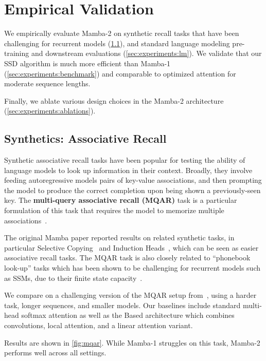 \section{Empirical Validation}
\label{sec:experiments}

We empirically evaluate Mamba-2 on synthetic recall tasks that have been challenging for recurrent models (\ref{sec:experiments:mqar}), and standard language modeling pre-training and downstream evaluations (\ref{sec:experiments:lm}).
We validate that our SSD algorithm is much more efficient than Mamba-1 (\ref{sec:experiments:benchmark}) and comparable to optimized attention for moderate sequence lengths.

Finally, we ablate various design choices in the Mamba-2 architecture (\ref{sec:experiments:ablations}).

\subsection{Synthetics: Associative Recall}
\label{sec:experiments:mqar}

Synthetic associative recall tasks have been popular for testing the ability of language models to look up information in their context. Broadly, they involve feeding autoregressive models pairs of key-value associations, and then prompting the model to produce the correct completion upon being shown a previously-seen key. The \textbf{multi-query associative recall (MQAR)} task is a particular formulation of this task that requires the model to memorize multiple associations~\citep{arora2024zoology}.

The original Mamba paper reported results on related synthetic tasks, in particular Selective Copying~\citep{gu2023mamba} and Induction Heads~\citep{olsson2022context}, which can be seen as easier associative recall tasks. The MQAR task is also closely related to ``phonebook look-up'' tasks which has been shown to be challenging for recurrent models such as SSMs, due to their finite state capacity~\citep{jelassi2024repeat,de2024griffin}.

We compare on a challenging version of the MQAR setup from~\citep{arora2024simple}, using a harder task, longer sequences, and smaller models. Our baselines include standard multi-head softmax attention as well as the Based architecture which combines convolutions, local attention, and a linear attention variant.

Results are shown in \ref{fig:mqar}.
While Mamba-1 struggles on this task, Mamba-2 performs well across all settings.

